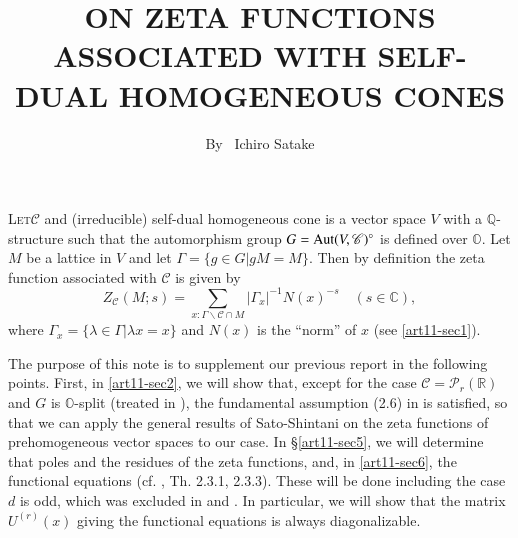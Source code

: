 \title{ON ZETA FUNCTIONS ASSOCIATED WITH SELF-DUAL HOMOGENEOUS CONES}

\author{By~ Ichiro Satake}

\date{}
\maketitle

\setcounter{page}{211} 
\setcounter{pageoriginal}{176}
\textsc{Let}\pageoriginale $\mathscr{C}$  and (irreducible) self-dual homogeneous cone is a vector space $V$ with a $\mathbb{Q}$-structure such that the automorphism group $G=\operatorname{Aut}(V,\mathscr{C})^{\circ}$ is defined over $\mathbb{O}$. Let $M$ be a lattice in $V$ and let $\Gamma=\{g\in G|gM=M\}$. Then by definition the zeta function associated with $\mathscr{C}$ is given by
\begin{equation}
Z_{\mathscr{C}}(M;s)=\sum\limits_{x:\Gamma\backslash\mathscr{C}\cap M}|\Gamma_{x}|^{-1}N(x)^{-s}\quad (s\in\mathbb{C}),\label{art11-eq1}
\end{equation}
where $\Gamma_{x}=\{\lambda\in\Gamma|\lambda x=x\}$ and $N(x)$ is the ``norm'' of $x$ (see \ref{art11-sec1}).

The purpose of this note is to supplement our previous report \cite{art11-keySO} in the following points. First, in \ref{art11-sec2}, we will show that, except for the case $\mathscr{C}=\mathscr{P}_{r}(\mathbb{R})$ and $G$ is $\mathbb{O}$-split (treated in \cite{art11-keySh}), the fundamental assumption (2.6) in \cite{art11-keySS} is satisfied, so that we can apply the general results of Sato-Shintani on the zeta functions of prehomogeneous vector spaces to our case. In \S\ref{art11-sec5}, we will determine that poles and the residues of the zeta functions, and, in \ref{art11-sec6}, the functional equations (cf. \cite{art11-keySO}, Th. 2.3.1, 2.3.3). These will be done including the case $d$ is odd, which was excluded in \cite{art11-keySF} and \cite{art11-keySO}. In particular, we will show that the matrix $U^{(r)}(x)$ giving the functional equations is always diagonalizable.

